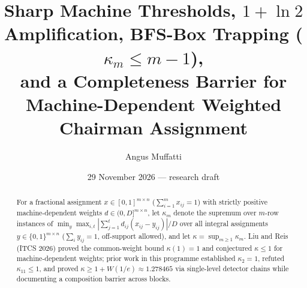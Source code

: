 \documentclass[11pt]{article}
\title{Sharp Machine Thresholds, $1+\ln 2$ Amplification, BFS-Box Trapping ($\kappa_m\le m-1$),\\
and a Completeness Barrier for Machine-Dependent Weighted Chairman Assignment}
\author{Angus Muffatti}
\date{29 November 2026 --- research draft}
\theoremstyle{definition}
\newcommand{\W}{W}
\begin{document}
\maketitle

\begin{abstract}
For a fractional assignment $x\in[0,1]^{m\times n}$ ($\sum_{i=1}^m x_{ij}=1$) with strictly positive machine-dependent weights $d\in(0,D]^{m\times n}$, let $\kappa_m$ denote the supremum over $m$-row instances of $\min_y \max_{i,t} |\sum_{j=1}^t d_{ij}(x_{ij}-y_{ij})|/D$ over all integral assignments $y\in\{0,1\}^{m\times n}$ ($\sum_i y_{ij}=1$, off-support allowed), and let $\kappa=\sup_{m\ge1}\kappa_m$.
Liu and Reis (ITCS 2026) proved the common-weight bound $\kappa(1)=1$ and conjectured $\kappa\le 1$ for machine-dependent weights; prior work in this programme established $\kappa_2=1$, refuted $\kappa_{11}\le 1$, and proved $\kappa\ge 1+\W(1/e)\approx 1.278465$ via single-level detector chains while documenting a composition barrier across blocks.


\end{abstract}
\end{document}
